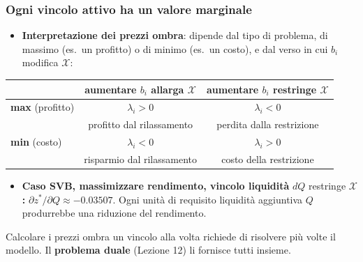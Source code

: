 %

\begin{frame}%
%

\frametitle{Ogni vincolo attivo ha un valore marginale}%
%

%


\begin{itemize}
\item \textbf{Interpretazione dei prezzi ombra}: dipende dal tipo di problema,
di massimo (es.\ un profitto) o di minimo (es.\ un costo), e dal verso in cui
$b_{i}$ modifica $\mathcal{X}$:
\end{itemize}

\begin{center}
{\small
\begin{tabular}
[c]{lcc}\hline
& aumentare $b_{i}$ \textbf{allarga} $\mathcal{X}$ & aumentare $b_{i}$
\textbf{restringe} $\mathcal{X}$\\\hline
\textbf{max} (profitto) & $\lambda_{i}>0$ & $\lambda_{i}<0$\\
& {\footnotesize profitto dal rilassamento} & {\footnotesize perdita dalla
restrizione}\\[4pt]%
\textbf{min} (costo) & $\lambda_{i}<0$ & $\lambda_{i}>0$\\
& {\footnotesize risparmio dal rilassamento} & {\footnotesize costo della
restrizione}\\\hline
\end{tabular}
}
\end{center}

\begin{itemize}
\item \textbf{Caso SVB, massimizzare rendimento, vincolo liquidit\`{a} }$dQ$
restringe $\mathcal{X}$\textbf{:} $\partial z^{\ast}/\partial Q\approx
-0.03507$. Ogni unit\`{a} di requisito liquidit\`{a} aggiuntiva $Q$
produrrebbe una riduzione del rendimento.
\end{itemize}

\medskip

{\small Calcolare i prezzi ombra un vincolo alla volta richiede di risolvere
pi\`u volte il modello. Il \textbf{problema duale} (Lezione 12) li fornisce
tutti insieme.}%

\transboxout
\end{frame}%


